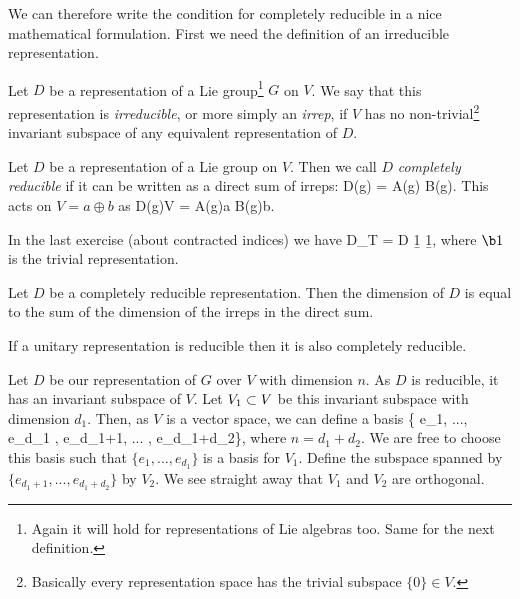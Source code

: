 We can therefore write the condition for completely reducible in a nice mathematical formulation. First we need the definition of an irreducible representation. 

    Let $D$ be a representation of a Lie group\footnote{Again it will hold for representations of Lie algebras too. Same for the next definition.} $G$ on $V$. We say that this representation is \textit{irreducible}, or more simply an \textit{irrep}, if $V$ has no non-trivial\footnote{Basically every representation space has the trivial subspace $\{0\}\in V$.} invariant subspace of any equivalent representation of $D$. 
\ed 

    Let $D$ be a representation of a Lie group on $V$. Then we call $D$ \textit{completely reducible} if it can be written as a direct sum of irreps:
    \be 
    \label{eqn:CompletelyReducibleDirectSum}
        D(g) = A(g) \oplus B(g).
    \ee 
    This acts on $V = a \oplus b$ as 
    \bse 
        D(g)V = A(g)a \oplus B(g)b.
    \ese 
\ed 

\bex 
    In the last exercise (about contracted indices) we have 
    \bse 
        D_T = D \oplus \b1 \oplus \b1,
    \ese 
    where $\b1$ is the trivial representation. 
\eex

\bp 
    Let $D$ be a completely reducible representation. Then the dimension of $D$ is equal to the sum of the dimension of the irreps in the direct sum.
\ep 

\bt[Maschke]
    If a unitary representation is reducible then it is also completely reducible.
\et 

\bq 
    Let $D$ be our representation of $G$ over $V$ with dimension $n$. As $D$ is reducible, it has an invariant subspace of $V$. Let $V_1 \ss V$ be this invariant subspace with dimension $d_1$. Then, as $V$ is a vector space, we can define a basis
    \bse 
        \big\{ e_1, ..., e_{d_1} , e_{d_1+1}, ... , e_{d_1+d_2}\big\},
    \ese
    where $n=d_1+d_2$. We are free to choose this basis such that $\{e_1,...,e_{d_1}\}$ is a basis for $V_1$. Define the subspace spanned by $\{e_{d_1+1},...,e_{d_1+d_2}\}$ by $V_2$. We see straight away that $V_1$ and $V_2$ are orthogonal.
    
